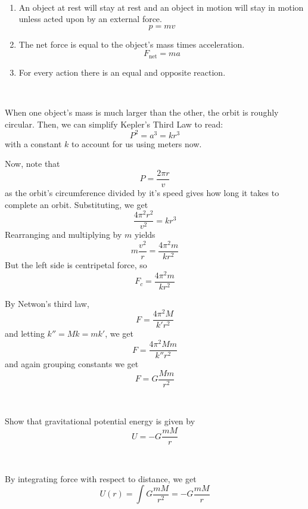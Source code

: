 \documentclass{article}
\begin{document}
\begin{customproof}
\

\begin{enumerate}
    \item An object at rest will stay at rest and an object in motion will stay in motion unless acted upon by an external force. $$p = mv$$
    \item The net force is equal to the object's mass times acceleration. $$F_\text{net} = ma$$
    \item For every action there is an equal and opposite reaction. 
\end{enumerate}
\end{customproof}

\begin{proposition}
\

When one object's mass is much larger than the other, the orbit is roughly circular. Then, we can simplify Kepler's Third Law to read: $$P^2 = a^3 = kr^3$$with a constant $k$ to account for us using meters now. 

Now, note that $$P = \frac{2\pi r}{v}$$as the orbit's circumference divided by it's speed gives how long it takes to complete an orbit. Substituting, we get $$\frac{4\pi^2r^2}{v^2} = kr^3$$Rearranging and multiplying by $m$ yields $$m\frac{v^2}{r} = \frac{4\pi^2m}{kr^2}$$But the left side is centripetal force, so $$F_c = \frac{4\pi^2 m}{kr^2}$$

By Netwon's third law, $$F = \frac{4\pi^2M}{k' r^2}$$and letting $k'' = Mk = mk'$, we get $$F = \frac{4\pi^2 Mm}{k''r^2}$$ and again grouping constants we get $$F = G\frac{Mm}{r^2}$$
\end{proposition}

\begin{theorem}
\

Show that gravitational potential energy is given by $$U = -G \frac{mM}{r}$$
\end{theorem}

\begin{customproof}
\

By integrating force with respect to distance, we get $$U(r) = \int G\frac{mM}{r^2} = -G\frac{mM}{r}$$
\end{customproof}
\end{document}
